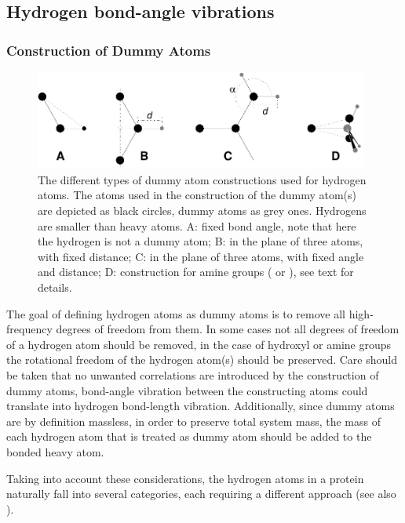 \subsection{Hydrogen bond-angle vibrations}
\label{sec:dummyhydro}
\subsubsection{Construction of Dummy Atoms} %
\begin{figure}
\centerline{\includegraphics[width=11cm]{plots/dumtypes}}
\caption[Dummy atom constructions for hydrogen atoms.]{The different
types of dummy atom constructions used for hydrogen atoms. The atoms
used in the construction of the dummy atom(s) are depicted as black
circles, dummy atoms as grey ones. Hydrogens are smaller than heavy
atoms. {\sf A}: fixed bond angle, note that here the hydrogen is not a
dummy atom; {\sf B}: in the plane of three atoms, with fixed distance;
{\sf C}: in the plane of three atoms, with fixed angle and distance;
{\sf D}: construction for amine groups ({\amine} or {\aminep}), see
text for details.}
\label{fig:dumhydro}
\end{figure}

The goal of defining hydrogen atoms as dummy atoms is to remove all
high-frequency degrees of freedom from them. In some cases not all
degrees of freedom of a hydrogen atom should be removed, {\eg} in the
case of hydroxyl or amine groups the rotational freedom of the
hydrogen atom(s) should be preserved. Care should be taken that no
unwanted correlations are introduced by the construction of dummy
atoms, {\eg} bond-angle vibration between the constructing atoms could
translate into hydrogen bond-length vibration. Additionally, since
dummy atoms are by definition massless, in order to preserve total
system mass, the mass of each hydrogen atom that is treated as dummy
atom should be added to the bonded heavy atom.

Taking into account these considerations, the hydrogen atoms in a
protein naturally fall into several categories, each requiring a
different approach (see also ).

